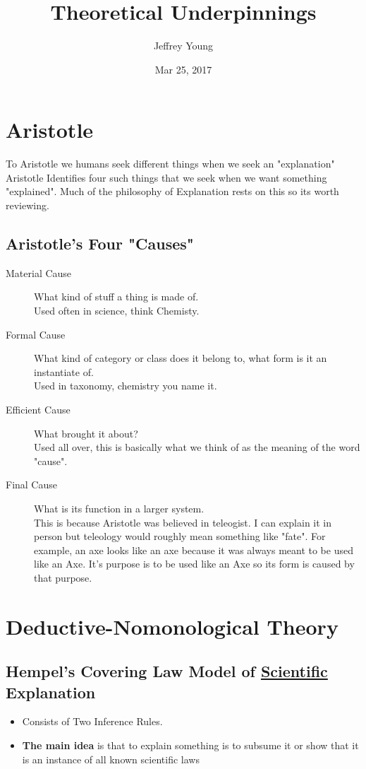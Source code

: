 \documentclass[10pt, letterpaper]{article}
\author{Jeffrey Young}
\date{Mar 25, 2017}
\title{Theoretical Underpinnings}
\begin{document}
\maketitle

\section*{Aristotle}
\label{sec:orgba40103}
To Aristotle we humans seek different things when we seek an "explanation" Aristotle Identifies four such things that we seek when we want something "explained". Much of the philosophy of Explanation rests on this so its worth reviewing.

\subsection*{Aristotle's Four "Causes"}
\label{sec:org4030254}
\begin{description}
\item[{Material Cause}] What kind of stuff a thing is made of. \\
Used often in science, think Chemisty.
\item[{Formal Cause}] What kind of category or class does it belong to, what form is it an instantiate of. \\
Used in taxonomy, chemistry you name it.
\item[{Efficient Cause}] What brought it about? \\
Used all over, this is basically what we think of as the meaning of the word "cause".
\item[{Final Cause}] What is its function in a larger system. \\
This is because Aristotle was believed in teleogist. I can explain it in person but teleology would roughly mean something like "fate". For example, an axe looks like an axe because it was always meant to be used like an Axe. It's purpose is to be used like an Axe so its form is caused by that purpose.
\end{description}

\section*{Deductive-Nomonological Theory}
\label{sec:org5d9af48}

\subsection*{Hempel's Covering Law Model of \underline{Scientific} Explanation}
\label{sec:orgec561b6}
\begin{itemize}
\item Consists of Two Inference Rules.
\item \textbf{The main idea} is that to explain something is to subsume it or show that it is an instance of all known scientific laws
\end{itemize}
\end{document}
